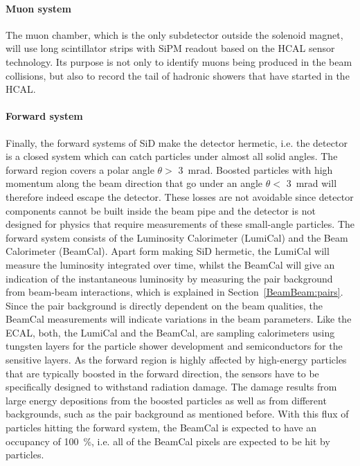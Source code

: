 \paragraph{Muon system}
The muon chamber, which is the only subdetector outside the solenoid magnet, will use long scintillator strips with SiPM readout based on the HCAL sensor technology.
Its purpose is not only to identify muons being produced in the beam collisions, but also to record the tail of hadronic showers that have started in the HCAL.

\paragraph{Forward system}
Finally, the forward systems of SiD make the detector hermetic, i.e. the detector is a closed system which can catch particles under almost all solid angles.
The forward region covers a polar angle $\theta > $ \SI{3}{\milli\radian}.
Boosted particles with high momentum along the beam direction that go under an angle $\theta < $ \SI{3}{\milli\radian} will therefore indeed escape the detector.
These losses are not avoidable since detector components cannot be built inside the beam pipe and the detector is not designed for physics that require measurements of these small-angle particles.
The forward system consists of the Luminosity Calorimeter (LumiCal) and the Beam Calorimeter (BeamCal).
Apart form making SiD hermetic, the LumiCal will measure the luminosity integrated over time, whilst the BeamCal will give an indication of the instantaneous luminosity by measuring the \positron \electron pair background from beam-beam interactions, which is explained in Section~\ref{BeamBeam:pairs}.
Since the pair background is directly dependent on the beam qualities, the BeamCal measurements will indicate variations in the beam parameters.
Like the ECAL, both, the LumiCal and the BeamCal, are sampling calorimeters using tungsten layers for the particle shower development and semiconductors for the sensitive layers.
As the forward region is highly affected by high-energy particles that are typically boosted in the forward direction, the sensors have to be specifically designed to withstand radiation damage.
The damage results from large energy depositions from the boosted particles as well as from different backgrounds, such as the pair background as mentioned before.
With this flux of particles hitting the forward system, the BeamCal is expected to have an occupancy of \SI{100}{\percent}, i.e. all of the BeamCal pixels are expected to be hit by particles.
